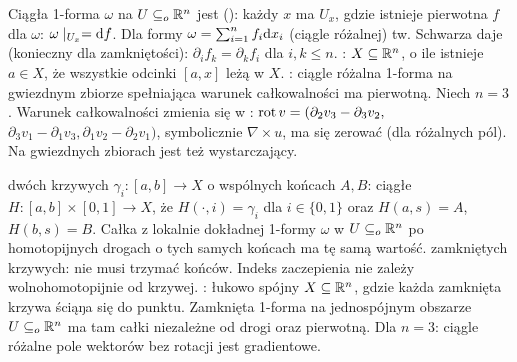 Ciągła  1-forma $\omega$ na $U \subseteq_o \mathbb{R}^n$ jest  (): każdy $x$ ma $U_x$, gdzie istnieje pierwotna $f$ dla $\omega$: $\omega \mid_{U_x} = \textrm{d} f$.
Dla formy $\omega = \sum_{i=1}^n f_i \textrm{d} x_i$ (ciągle różalnej) tw. Schwarza daje  (konieczny dla zamkniętości): $\partial_i f_k = \partial_k f_i$ dla $i, k \le n$.
: $X \subseteq \mathbb{R}^n$, o ile istnieje $a \in X$, że wszystkie odcinki $[a,x]$ leżą w $X$.
: ciągle różalna 1-forma na gwiezdnym zbiorze spełniająca warunek całkowalności
 ma pierwotną.
Niech $n = 3$.
Warunek całkowalności zmienia się w : $\operatorname{rot} v = (\partial_2 v_3 - \partial_3 v_2,$ $\partial_3 v_1 - \partial_1 v_3, \partial_1 v_2 - \partial_2 v_1)$, symbolicznie $\nabla \times u$, ma się zerować (dla różalnych pól).
Na gwiezdnych zbiorach jest też wystarczający.

  dwóch krzywych $\gamma_i \colon [a,b] \to X$ o wspólnych końcach $A, B$: ciągłe $H \colon [a,b] \times [0,1] \to X$, że $H(\cdot, i) = \gamma_i$ dla $i \in \{0, 1\}$ oraz $H(a, s) = A$, $H(b,s) = B$.
Całka z lokalnie dokładnej 1-formy $\omega$ w $U \subseteq_o \mathbb{R}^n$ po homotopijnych drogach o tych samych końcach ma tę samą wartość.
 zamkniętych krzywych: nie musi trzymać końców.
Indeks zaczepienia nie zależy wolnohomotopijnie od krzywej.
: łukowo spójny $X \subseteq \mathbb{R}^n$, gdzie każda zamknięta krzywa ściąŋa się do punktu.
Zamknięta 1-forma na jednospójnym obszarze $U \subseteq_o \mathbb{R}^n$ ma tam całki niezależne od drogi oraz pierwotną.
Dla $n = 3$: ciągle różalne pole wektorów bez rotacji jest gradientowe.